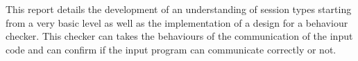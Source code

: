 \begin{thesisabstract}
This report details the development of an understanding of session types starting from a very basic level as well as the implementation of a design for a behaviour checker. This checker can takes the behaviours of the communication of the input code and can confirm if the input program can communicate correctly or not. 
\end{thesisabstract}